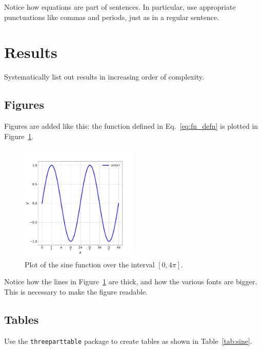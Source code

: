 \documentclass[11pt,review]{elsarticle}
\begin{document}
Notice how equations are part of sentences. In particular, use appropriate punctuations like commas and periods, just as in a regular sentence.

\section{Results} \label{sec:results}

Systematically list out results in increasing order of complexity.

\subsection{Figures}

Figures are added like this: the function defined in Eq.~\eqref{eq:fn_defn} is plotted in Figure~\ref{fig:sine}.

\begin{figure}[h!]
\centering
\includegraphics[width=0.5\textwidth]{Figures/sine.pdf}
\caption{Plot of the sine function over the interval $[0,4\pi]$.}
\label{fig:sine}
\end{figure}

Notice how the lines in Figure~\ref{fig:sine} are thick, and how the various fonts are bigger. This is necessary to make the figure readable.

\subsection{Tables}

Use the \texttt{threeparttable} package to create tables as shown in Table~\ref{tab:sine}.
\end{document}
